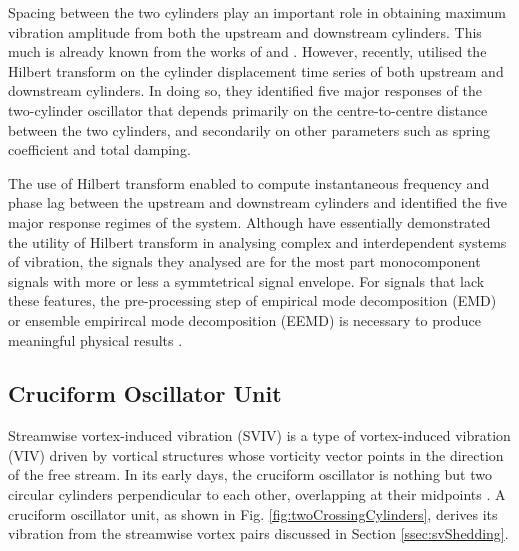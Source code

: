 \documentclass[oneside]{utmthesis}
\begin{document}
Spacing between the two cylinders play an important role in obtaining maximum vibration amplitude from both the upstream and downstream cylinders. This much is already known from the works of \citet{Park2016} and \citet{Ding2017}. However, recently, \citet{Yuan2020} utilised the Hilbert transform on the cylinder displacement time series of both upstream and downstream cylinders. In doing so, they identified five major responses of the two-cylinder oscillator that depends primarily on the centre-to-centre distance between the two cylinders, and secondarily on other parameters such as spring coefficient and total damping.

The use of Hilbert transform enabled \citet{Yuan2020} to compute instantaneous frequency and phase lag between the upstream and downstream cylinders and identified the five major response regimes of the system. Although \citet{Yuan2020} have essentially demonstrated the utility of Hilbert transform in analysing complex and interdependent systems of vibration, the signals they analysed are for the most part monocomponent signals with more or less a symmtetrical signal envelope. For signals that lack these features, the pre-processing step of empirical mode decomposition (EMD) or ensemble empirircal mode decomposition (EEMD) is necessary to produce meaningful physical results \citep{Chen2019}.

\subsection{Cruciform Oscillator Unit}
Streamwise vortex-induced vibration (SVIV) is a type of vortex-induced vibration (VIV) driven by vortical structures whose vorticity vector points in the direction of the free stream. In its early days, the cruciform oscillator is nothing but two circular cylinders perpendicular to each other, overlapping at their midpoints \citep{Zdravkovich1985}. A cruciform oscillator unit, as shown in Fig. \ref{fig:twoCrossingCylinders}, derives its vibration from the streamwise vortex pairs discussed in Section \ref{ssec:svShedding}.
\end{document}
